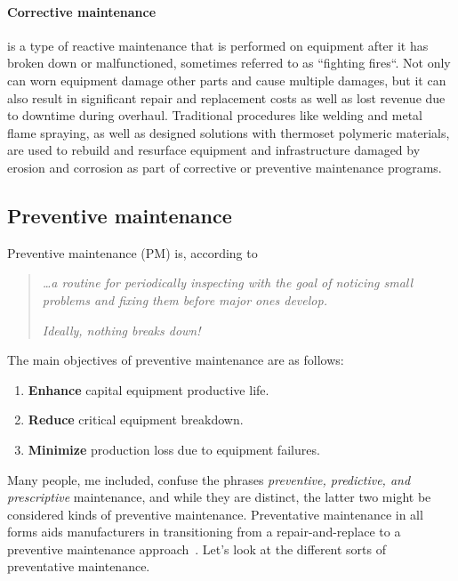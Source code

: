 \paragraph{Corrective maintenance} is a type of reactive maintenance that is performed on equipment after it has broken down or malfunctioned,
sometimes referred to as ``fighting fires``. Not only can worn equipment damage other parts and cause multiple damages, but it can also result in significant repair and
replacement costs as well as lost revenue due to downtime during overhaul. Traditional procedures like welding and metal flame spraying,
as well as designed solutions with thermoset polymeric materials, are used to rebuild and resurface equipment and infrastructure
damaged by erosion and corrosion as part of corrective or preventive maintenance programs.

\subsection{Preventive maintenance}
Preventive maintenance (PM) is, according to \citeauthor{Article:nyt_hinds_1985_preventive}~\cite{Article:nyt_hinds_1985_preventive}
\begin{quote}
    \textit{\dots a routine for periodically inspecting with the goal of noticing small problems and fixing them before major ones develop.}

    \textit{Ideally, nothing breaks down!}
\end{quote}

The main objectives of preventive maintenance are as follows:
\begin{enumerate}
    \item \textbf{Enhance} capital equipment productive life.
    \item \textbf{Reduce} critical equipment breakdown.
    \item \textbf{Minimize} production loss due to equipment failures.
\end{enumerate}
Many people, me included, confuse the phrases \textit{preventive, predictive, and prescriptive} maintenance, and while they are distinct, the latter two might
be considered kinds of preventive maintenance. Preventative maintenance in all forms aids manufacturers in transitioning from a
repair-and-replace to a preventive maintenance approach~\cite{Misc:trout_2019_preventive}. Let's look at the different sorts of preventative maintenance.

